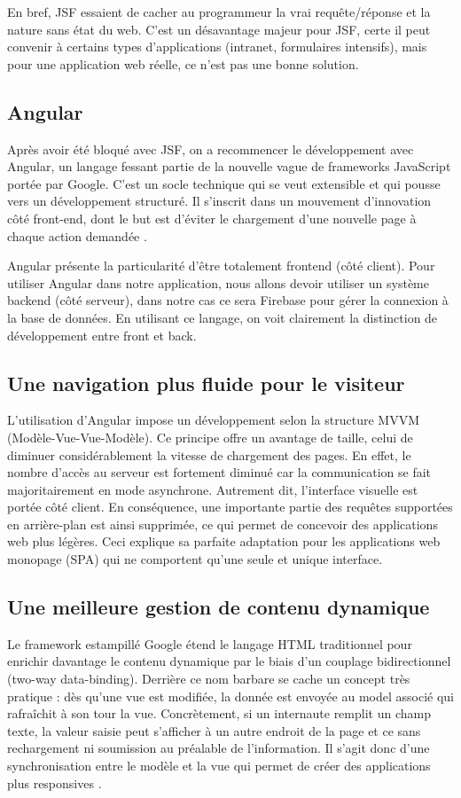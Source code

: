 En bref, JSF essaient de cacher au programmeur la vrai requête/réponse et la nature sans état du web. C'est un désavantage majeur pour JSF, certe il peut convenir à certains types d'applications (intranet, formulaires intensifs), mais pour une application web réelle, ce n'est pas une bonne solution.

\subsection{Angular}
Après avoir été bloqué avec JSF, on a recommencer le développement avec Angular,  un langage fessant partie de la nouvelle vague de frameworks JavaScript portée par Google. C'est un socle technique qui se veut extensible et qui pousse vers un développement structuré. Il s'inscrit dans un mouvement d'innovation côté front-end, dont le but est d'éviter le chargement d'une nouvelle page à chaque action demandée \cite{angularBlog}.
\medskip

Angular présente la particularité d'être totalement frontend (côté client). Pour utiliser Angular dans notre application, nous allons devoir utiliser un système backend (côté serveur), dans notre cas ce sera Firebase pour gérer la connexion à la base de données. En utilisant ce langage, on voit clairement la distinction de développement entre front et back.

\subsection{Une navigation plus fluide pour le visiteur}
L'utilisation d'Angular impose un développement selon la structure MVVM (Modèle-Vue-Vue-Modèle). Ce principe offre un avantage de taille, celui de diminuer considérablement la vitesse de chargement des pages. En effet, le nombre d'accès au serveur est fortement diminué car la communication se fait majoritairement en mode asynchrone. Autrement dit, l'interface visuelle est portée côté client. En conséquence, une importante partie des requêtes supportées en arrière-plan est ainsi supprimée, ce qui permet de concevoir des applications web plus légères. Ceci explique sa parfaite adaptation pour les applications web monopage (SPA) qui ne comportent qu'une seule et unique interface.

\subsection{Une meilleure gestion de contenu dynamique}
Le framework estampillé Google étend le langage HTML traditionnel pour enrichir davantage le contenu dynamique par le biais d'un couplage bidirectionnel (two-way data-binding). Derrière ce nom barbare se cache un concept très pratique : dès qu'une vue est modifiée, la donnée est envoyée au model associé qui rafraîchit à son tour la vue. Concrètement, si un internaute remplit un champ texte, la valeur saisie peut s'afficher à un autre endroit de la page et ce sans rechargement ni soumission au préalable de l'information. Il s'agit donc d'une synchronisation entre le modèle et la vue qui permet de créer des applications plus responsives \cite{angularNinja}.

